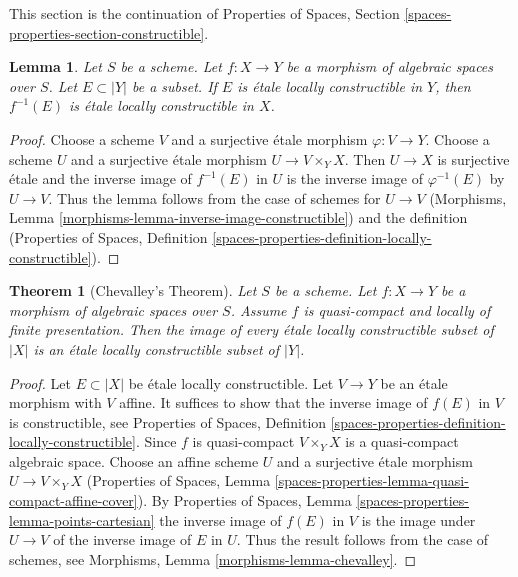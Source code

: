 \documentclass{stacks-project}
\theoremstyle{plain}
\newtheorem{theorem}[subsection]{Theorem}
\newtheorem{lemma}[subsection]{Lemma}
\theoremstyle{definition}
\theoremstyle{remark}
\numberwithin{equation}{subsection}
\begin{document}
\noindent
This section is the continuation of
Properties of Spaces, Section \ref{spaces-properties-section-constructible}.

\begin{lemma}
\label{lemma-inverse-image-constructible}
Let $S$ be a scheme.
Let $f : X \to Y$ be a morphism of algebraic spaces over $S$.
Let $E \subset |Y|$ be a subset.
If $E$ is \'etale locally constructible in $Y$, then
$f^{-1}(E)$ is \'etale locally constructible in $X$.
\end{lemma}

\begin{proof}
Choose a scheme $V$ and a surjective \'etale morphism $\varphi : V \to Y$.
Choose a scheme $U$ and a surjective \'etale morphism
$U \to V \times_Y X$. Then $U \to X$ is surjective \'etale
and the inverse image of $f^{-1}(E)$ in $U$ is the inverse
image of $\varphi^{-1}(E)$ by $U \to V$. Thus the lemma follows
from the case of schemes for $U \to V$
(Morphisms, Lemma \ref{morphisms-lemma-inverse-image-constructible})
and the definition (Properties of Spaces, Definition
\ref{spaces-properties-definition-locally-constructible}).
\end{proof}

\begin{theorem}[Chevalley's Theorem]
\label{theorem-chevalley}
Let $S$ be a scheme.
Let $f : X \to Y$ be a morphism of algebraic spaces over $S$.
Assume $f$ is quasi-compact and locally of finite presentation.
Then the image of every \'etale locally constructible subset of $|X|$ is
an \'etale locally constructible subset of $|Y|$.
\end{theorem}

\begin{proof}
Let $E \subset |X|$ be \'etale locally constructible.
Let $V \to Y$ be an \'etale morphism with $V$ affine.
It suffices to show that the inverse image of $f(E)$ in
$V$ is constructible, see Properties of Spaces, Definition
\ref{spaces-properties-definition-locally-constructible}.
Since $f$ is quasi-compact $V \times_Y X$ is a quasi-compact algebraic space.
Choose an affine scheme $U$ and a surjective \'etale morphism
$U \to V \times_Y X$ (Properties of Spaces, Lemma
\ref{spaces-properties-lemma-quasi-compact-affine-cover}).
By Properties of Spaces, Lemma \ref{spaces-properties-lemma-points-cartesian}
the inverse image of $f(E)$ in $V$ is the image under $U \to V$
of the inverse image of $E$ in $U$.
Thus the result follows from the case of schemes, see
Morphisms, Lemma \ref{morphisms-lemma-chevalley}.
\end{proof}
\end{document}
